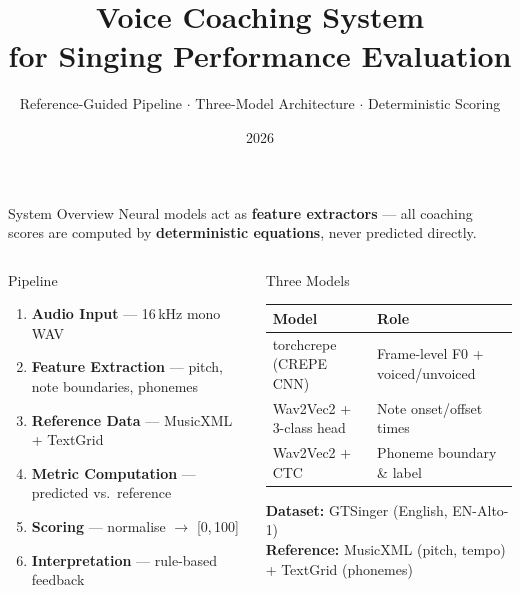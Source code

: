 \documentclass[aspectratio=169,9pt]{beamer}
\title[Voice Coaching System]{Voice Coaching System\\for Singing Performance Evaluation}
\subtitle{Reference-Guided Pipeline $\cdot$ Three-Model Architecture $\cdot$ Deterministic Scoring}
\author{}
\institute{Drexel University}
\date{2026}
\begin{document}
\begin{frame}
  \titlepage
\end{frame}

\begin{frame}{System Overview}
  Neural models act as \textbf{feature extractors} — all coaching scores are
  computed by \textbf{deterministic equations}, never predicted directly.

  \medskip
  \begin{columns}[T]
      \begin{block}{Pipeline}
        \small
        \begin{enumerate}\setlength\itemsep{2pt}
          \item \textbf{Audio Input} — 16\,kHz mono WAV
          \item \textbf{Feature Extraction} — pitch, note boundaries, phonemes
          \item \textbf{Reference Data} — MusicXML + TextGrid
          \item \textbf{Metric Computation} — predicted vs.\ reference
          \item \textbf{Scoring} — normalise $\rightarrow$ [0,\,100]
          \item \textbf{Interpretation} — rule-based feedback
        \end{enumerate}
      \end{block}

      \begin{block}{Three Models}
        \small
        \renewcommand{\arraystretch}{1.2}
        \begin{tabular}{@{}lp{5.2cm}@{}}
          \toprule
          Model & Role \\
          \midrule
          torchcrepe (CREPE CNN) & Frame-level F0 + voiced/unvoiced \\
          Wav2Vec2 + 3-class head & Note onset/offset times \\
          Wav2Vec2 + CTC & Phoneme boundary \& label \\
          \bottomrule
        \end{tabular}
        \medskip\par
        \textbf{Dataset:} GTSinger (English, EN-Alto-1)\\
        \textbf{Reference:} MusicXML (pitch, tempo) + TextGrid (phonemes)
      \end{block}
  \end{columns}
\end{frame}
\end{document}
